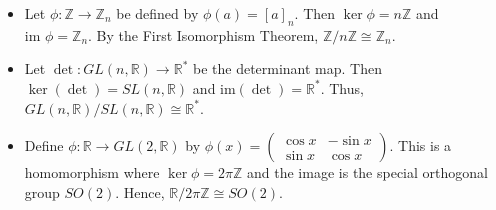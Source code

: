 \begin{example}
\begin{itemize}
    \item Let $\phi : \mathbb{Z} \to \mathbb{Z}_n$ be defined by $\phi(a) = [a]_n$. Then $\ker \phi = n\mathbb{Z}$ and $\text{im } \phi = \mathbb{Z}_n$. By the First Isomorphism Theorem, $\mathbb{Z}/n\mathbb{Z} \cong \mathbb{Z}_n$.
    
    \item Let $\det : GL(n, \mathbb{R}) \to \mathbb{R}^*$ be the determinant map. Then $\ker(\det) = SL(n, \mathbb{R})$ and $\text{im}(\det) = \mathbb{R}^*$. Thus, $GL(n, \mathbb{R})/SL(n, \mathbb{R}) \cong \mathbb{R}^*$.
    
    \item Define $\phi : \mathbb{R} \to GL(2, \mathbb{R})$ by $\phi(x) = \begin{pmatrix} \cos x & -\sin x \\ \sin x & \cos x \end{pmatrix}$. This is a homomorphism where $\ker \phi = 2\pi\mathbb{Z}$ and the image is the special orthogonal group $SO(2)$. Hence, $\mathbb{R}/2\pi\mathbb{Z} \cong SO(2)$.
\end{itemize}
\end{example}

